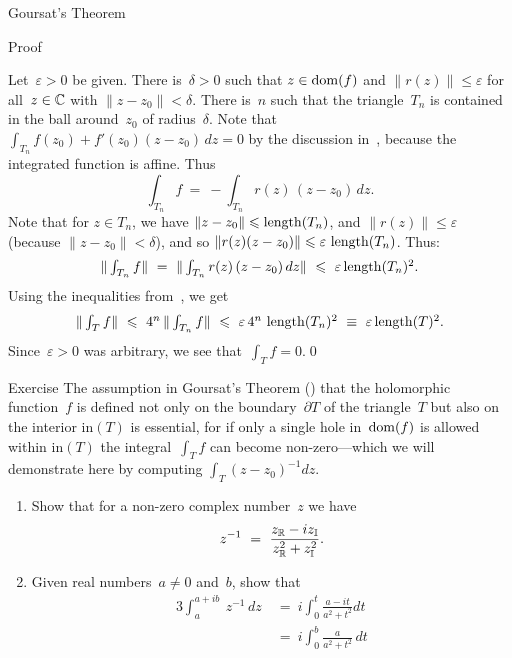 \documentclass[a]{subfiles}
\begin{document}
\begin{parsec}
\begin{point}[goursat]{Goursat's Theorem}
\begin{point}[goursat-1]{Proof}
\begin{point}
Let~$\varepsilon >0$ be given.
There is~$\delta>0$
such that $z\in\operatorname{dom}(f)$
and $\|r(z)\|\leq \varepsilon$
for all~$z\in \mathbb{C}$ with $\|z-z_0\|<\delta$.
There is~$n$ such that the triangle~$T_n$ is contained
in the ball around~$z_0$ of radius~$\delta$.
Note that $\int_{T_n} f(z_0)+f'(z_0)(z-z_0)\,dz=0$
by the discussion in~, because
the integrated function is affine.
Thus
\begin{equation*}
\textstyle
\int_{T_n} f \  = \ -\int_{T_n}r(z)\,(z-z_0)\,dz.
\end{equation*}
Note that for $z\in T_n$,
we have  $\|z-z_0\|\leqslant \operatorname{length}(T_n)$,
and $\|r(z)\|\leq \varepsilon$ (because $\|z-z_0\|< \delta$),
and so $\|r(z)(z-z_0)\|\leqslant \varepsilon\,\operatorname{length}(T_n)$.
Thus:
\begin{equation*}
\textstyle
\|\int_{T_n} f\| \  = \ \|\int_{T_n}r(z)\,(z-z_0)\,dz\|
\ \leqslant\ \varepsilon\operatorname{length}(T_n)^2.
\end{equation*}
Using the inequalities from~,
we get
\begin{equation*}
\textstyle
\|\int_T f\|\ \leqslant\ 4^n\, \|\int_{T_n} f\|
\ \leqslant\ \varepsilon \,4^n\,\operatorname{length}(T_n)^2 
\ \equiv\ \varepsilon \operatorname{length}(T)^2.
\end{equation*}
Since~$\varepsilon>0$ was arbitrary,
we see that~$\int_T f=0$.\qed
\end{point}
\end{point}
\end{point}%
\begin{point}[invint]{Exercise}%
	The assumption in Goursat's Theorem ()
that the holomorphic function~$f$
is defined not only on the boundary~$\partial T$
of the triangle~$T$
but also on the interior $\mathrm{in}(T)$
is essential,
for if only a single hole in~$\operatorname{dom}(f)$ is allowed within $\mathrm{in}(T)$
the integral~$\int_T f$ can become non-zero---which we will demonstrate
here by computing
$\int_T (z-z_0)^{-1}dz$.
\begin{enumerate}%
\item
Show that for a non-zero
complex number~$z$ we have
\begin{equation*}
	z^{-1}\ =\  \frac{\Real{z}-i\Imag{z}}{\Real{z}^2+\Imag{z}^2}.
\end{equation*}
\item
Given real numbers~$a\neq 0$ and~$b$,
show that
\begin{alignat*}{3}
	\int_{a}^{a+ib}\ 
	z^{-1}\,dz
	\ &=\ 
	i\int_{0}^t \frac{a-it}{a^2+t^2}dt
	\\
	\ &=\ 
	i\int_0^b \frac{a}{a^2+t^2}\,dt 

\end{alignat*}
\end{enumerate}
\end{point}
\end{parsec}
\end{document}
